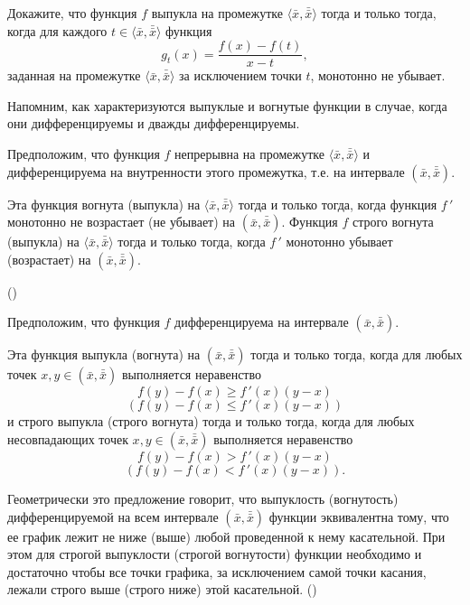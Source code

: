 \begin{exer}
    Докажите, что функция $f$ выпукла на промежутке
    $\langle \bar{x},\bar{\bar{x}}\rangle$
    тогда и только тогда, когда для каждого
    $t\in\langle \bar{x},\bar{\bar{x}}\rangle$ функция
    \[g_{t}(x)=\frac{f(x)-f(t)}{x-t},\]
    заданная на промежутке $\langle \bar{x},\bar{\bar{x}}\rangle$ за исключением точки
    $t$, монотонно не убывает.
\end{exer}


    Напомним, как характеризуются выпуклые и
    вогнутые функции в случае, когда они дифференцируемы и дважды дифференцируемы.
\begin{prop}
    Предположим, что функция $f$ непрерывна на промежутке
    $\langle \bar{x},\bar{\bar{x}} \rangle$
     и дифференцируема на внутренности этого промежутка, т.е. на
     интервале $(\bar{x},\bar{\bar{x}})$.

    Эта функция вогнута (выпукла) на $\langle \bar{x},\bar{\bar{x}} \rangle$
    тогда и только тогда, когда
    функция $f\,'$ монотонно не возрастает (не убывает) на $(\bar{x},\bar{\bar{x}})$.
    Функция $f$ строго вогнута (выпукла) на
    $\langle \bar{x},\bar{\bar{x}} \rangle$ тогда и только тогда, когда
     $f\,'$ монотонно убывает (возрастает) на $(\bar{x},\bar{\bar{x}})$.
\end{prop}                          ()

\begin{prop}
    \label{kasatel}
    Предположим, что функция $f$ дифференцируема на интервале
    $(\bar{x},\bar{\bar{x}})$.


    Эта функция выпукла (вогнута) на $(\bar{x},\bar{\bar{x}})$ тогда и
    только тогда, когда для любых точек $x,y\in(\bar{x},\bar{\bar{x}})$
    выполняется неравенство
    \[f(y)-f(x)\geqslant f\,'(x)(y-x)\]
    \[(f(y)-f(x)\leqslant f\,'(x)(y-x))\]
    и строго выпукла (строго вогнута) тогда и только тогда, когда
    для любых несовпадающих точек $x,y\in(\bar{x},\bar{\bar{x}})$
    выполняется неравенство
    \[f(y)-f(x)> f\,'(x)(y-x)\]
    \[(f(y)-f(x)< f\,'(x)(y-x)).\]
\end{prop}
    Геометрически это предложение говорит, что выпуклость
    (вогнутость) дифференцируемой на всем интервале
    $(\bar{x},\bar{\bar{x}})$ функции эквивалентна тому, что ее
    график лежит не ниже (выше) любой проведенной к нему касательной. При
    этом для строгой выпуклости (строгой вогнутости) функции
    необходимо и достаточно чтобы все точки графика, за исключением
    самой точки касания, лежали строго выше (строго ниже) этой
    касательной. ()



